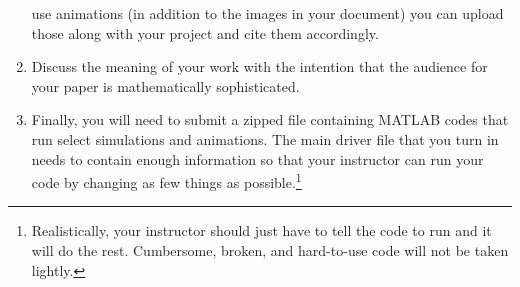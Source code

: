 \begin{enumerate}
        use animations (in addition to the images in your document) you can upload those
        along with your project and cite them accordingly.
    \item Discuss the meaning of your work with the intention that the audience for your
        paper is mathematically sophisticated.
    \item Finally, you will need to submit a zipped file containing MATLAB codes that run
        select simulations and animations.  The main driver file that you turn in needs to
        contain enough information so that your instructor can run your code by changing
        as few things as possible.\footnote{Realistically, your instructor should just
            have to tell the code to run and it will do the rest.  Cumbersome, broken, and
        hard-to-use code will not be taken lightly.}
\end{enumerate}



